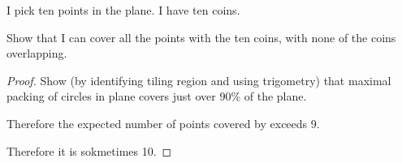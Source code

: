 \documentclass[12pt]{article}
\begin{document}
\newpage
\begin{mdframed}
   I pick ten points in the plane. I have ten coins.

   Show that I can cover all the points with the ten coins, with none of the coins overlapping.
\end{mdframed}

\begin{proof}
  Show (by identifying tiling region and using trigometry) that maximal packing of circles in plane
  covers just over $90\%$ of the plane.

  Therefore the expected number of points covered by exceeds 9.

  Therefore it is sokmetimes 10.
\end{proof}
\end{document}
